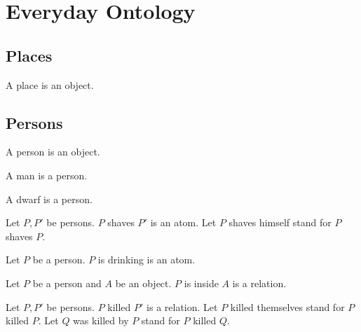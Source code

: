 \documentclass{article}
\begin{document}
\section{Everyday Ontology}

\begin{forthel}
\end{forthel}


\subsection{Places}

\begin{signature*}[forthel]
  A place is an object.
\end{signature*}


\subsection{Persons}

\begin{signature*}[forthel]
  A person is an object.
\end{signature*}

\begin{signature*}[forthel]
  A man is a person.
\end{signature*}

\begin{signature*}[forthel]
  A dwarf is a person.
\end{signature*}

\begin{signature*}[forthel]
  Let $P, P'$ be persons.
  $P$ shaves $P'$ is an atom.
  Let $P$ shaves himself stand for $P$ shaves $P$.
\end{signature*}

\begin{signature*}[forthel]
  Let $P$ be a person.
  $P$ is drinking is an atom.
\end{signature*}

\begin{signature*}[forthel]
  Let $P$ be a person and $A$ be an object.
  $P$ is inside $A$ is a relation.
\end{signature*}

\begin{signature*}[forthel]
  Let $P, P'$ be persons.
  $P$ killed $P'$ is a relation.
  Let $P$ killed themselves stand for $P$ killed $P$.
  Let $Q$ was killed by $P$ stand for $P$ killed $Q$.
\end{signature*}
\end{document}
